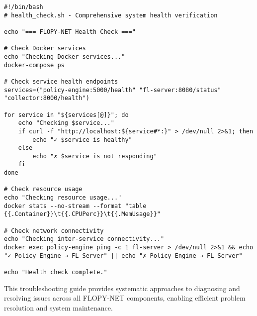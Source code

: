 \begin{lstlisting}[style=bashcode, caption=Comprehensive Health Check Script]
#!/bin/bash
# health_check.sh - Comprehensive system health verification

echo "=== FLOPY-NET Health Check ==="

# Check Docker services
echo "Checking Docker services..."
docker-compose ps

# Check service health endpoints
services=("policy-engine:5000/health" "fl-server:8080/status" "collector:8000/health")

for service in "${services[@]}"; do
    echo "Checking $service..."
    if curl -f "http://localhost:${service#*:}" > /dev/null 2>&1; then
        echo "✓ $service is healthy"
    else
        echo "✗ $service is not responding"
    fi
done

# Check resource usage
echo "Checking resource usage..."
docker stats --no-stream --format "table {{.Container}}\t{{.CPUPerc}}\t{{.MemUsage}}"

# Check network connectivity
echo "Checking inter-service connectivity..."
docker exec policy-engine ping -c 1 fl-server > /dev/null 2>&1 && echo "✓ Policy Engine → FL Server" || echo "✗ Policy Engine → FL Server"

echo "Health check complete."
\end{lstlisting}

This troubleshooting guide provides systematic approaches to diagnosing and resolving issues across all FLOPY-NET components, enabling efficient problem resolution and system maintenance.
